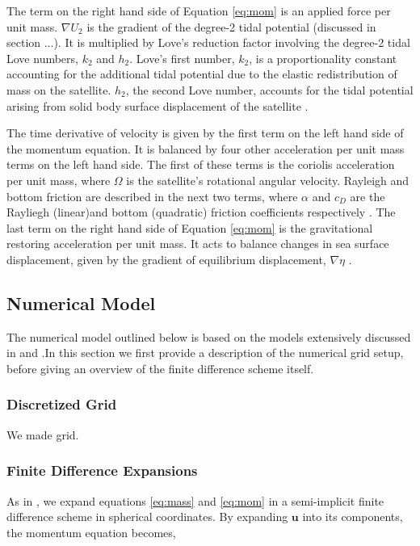 The term on the right hand side of Equation \ref{eq:mom} is an applied force per unit mass. $\nabla U_2$ is the gradient of the degree-2 tidal potential (discussed in section ...). It is multiplied by Love's reduction factor involving the degree-2 tidal Love numbers, $k_2$ and $h_2$. Love's first number, $k_2$, is a proportionality constant accounting for the additional tidal potential due to the elastic redistribution of mass on the satellite. $h_2$, the second Love number, accounts for the tidal potential arising from solid body surface displacement of the satellite \citep{love1911some}.

The time derivative of velocity is given by the first term on the left hand side of the momentum equation. It is balanced by four other acceleration per unit mass terms on the left hand side. The first of these terms is the coriolis acceleration per unit mass, where $\Omega$ is the satellite's rotational angular velocity. Rayleigh and bottom friction are described in the next two terms, where $\alpha$ and $c_D$ are the Rayliegh (linear)and bottom (quadratic) friction coefficients respectively \citep{sears1995tidal,chen2013tidal}. The last term on the right hand side of Equation \ref{eq:mom} is the gravitational restoring acceleration per unit mass. It acts to balance changes in sea surface displacement, given by the gradient of equilibrium displacement, $\nabla \eta$ .

\subsection{Numerical Model \label{subsec:model}}

The numerical model outlined below is based on the models extensively discussed in \citet{zahel1973diurnalk,zahel1978influence} and \citet{sears1994tidal,sears1995tidal}.In this section we first provide a description of the numerical grid setup, before giving an overview of the finite difference scheme itself.

\subsubsection{Discretized Grid}

We made grid. 

\subsubsection{Finite Difference Expansions}

As in \citep{sears1995tidal}, we expand equations \ref{eq:mass} and \ref{eq:mom} in a semi-implicit finite difference scheme in spherical coordinates. By expanding $\bm{u}$ into its components, the momentum equation becomes,

